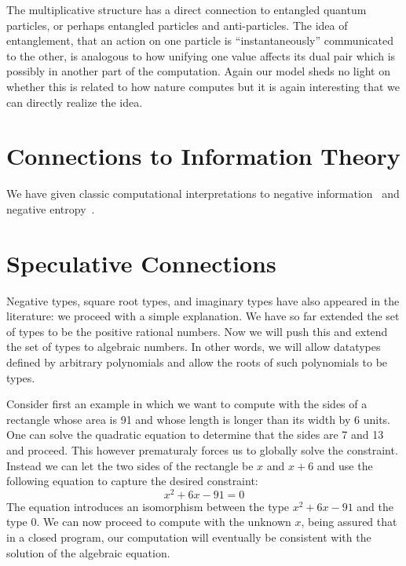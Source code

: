 \documentclass[11pt]{article}
\begin{document}
The multiplicative structure has a direct connection to entangled quantum
particles, or perhaps entangled particles and anti-particles.  The idea of
entanglement, that an action on one particle is ``instantaneously''
communicated to the other, is analogous to how unifying one value affects its
dual pair which is possibly in another part of the computation.  Again our
model sheds no light on whether this is related to how nature computes but it
is again interesting that we can directly realize the idea.

\section{Connections to Information Theory} 

We have given classic computational interpretations to negative
information~\cite{negative-information} and negative
entropy~\cite{negative-entropy}.

\section{Speculative Connections} 

Negative types, square root types, and imaginary types have also appeared in
the literature: we proceed with a simple explanation. We have so far extended
the set of types to be the positive rational numbers. Now we will push this
and extend the set of types to algebraic numbers. In other words, we will
allow datatypes defined by arbitrary polynomials and allow the roots of such
polynomials to be types.

Consider first an example in which we want to compute with the sides of a
rectangle whose area is 91 and whose length is longer than its width by 6
units. One can solve the quadratic equation to determine that the sides are 7
and 13 and proceed. This however prematuraly forces us to globally solve the
constraint. Instead we can let the two sides of the rectangle be $x$ and
$x+6$ and use the following equation to capture the desired constraint:
\[
x^2 + 6x - 91 = 0
\]
The equation introduces an isomorphism between the type $x^2 + 6x - 91$ and
the type $0$. We can now proceed to compute with the unknown $x$, being
assured that in a closed program, our computation will eventually be
consistent with the solution of the algebraic equation. 
\end{document}
